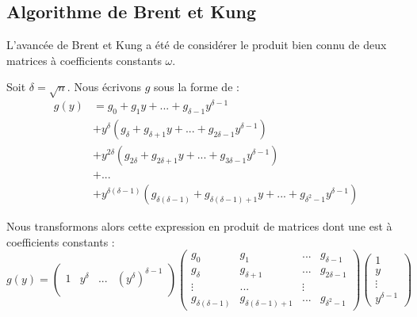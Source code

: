 \documentclass[a4paper]{article}
\begin{document}
\subsection{Algorithme de Brent et Kung}

L'avancée de Brent et Kung a été de considérer le produit bien connu de deux matrices à coefficients constants $\omega$.


Soit $\delta = \sqrt{n}$. Nous écrivons $g$ sous la forme de :
\begin{align*}
    g(y) &= g_0 + g_1y + ... + g_{\delta-1}y^{\delta-1} \\
        &+ y^\delta(g_\delta + g_{\delta+1}y + ... + g_{2\delta-1}y^{\delta-1}) \\
                                      &+ y^{2\delta}(g_{2\delta} + g_{2\delta+1}y + ... + g_{3\delta-1}y^{\delta-1}) \\
                                      &+ ... \\
                                      &+ y^{\delta(\delta-1)}(g_{\delta(\delta-1)} + g_{\delta(\delta-1)+1}y + ... + g_{\delta^2-1}y^{\delta-1}) 
\end{align*}

Nous transformons alors cette expression en produit de matrices dont une est à coefficients constants :
\[
g(y) = 
\begin{pmatrix}
    1 & y^\delta & ... & (y^\delta)^{\delta-1}  \\  
\end{pmatrix}
\begin{pmatrix}
    g_0 & g_1 & ... & g_{\delta-1} \\
    g_{\delta} & g_{\delta+1} & ... & g_{2\delta-1} \\
    \vdots & ... & \vdots \\
    g_{\delta(\delta-1)} & g_{\delta(\delta-1)+1} & ... & g_{\delta^2-1}
\end{pmatrix}
\begin{pmatrix}
    1 \\
    y \\
    \vdots \\
    y^{\delta-1}
\end{pmatrix}
\]
\end{document}
